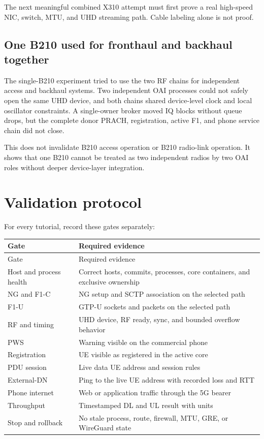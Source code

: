 \documentclass[11pt,a4paper]{article}
\begin{document}
The next meaningful combined X310 attempt must first prove a real high-speed
NIC, switch, MTU, and UHD streaming path. Cable labeling alone is not proof.

\subsection{One B210 used for fronthaul and backhaul together}

The single-B210 experiment tried to use the two RF chains for independent
access and backhaul systems. Two independent OAI processes could not safely
open the same UHD device, and both chains shared device-level clock and local
oscillator constraints. A single-owner broker moved IQ blocks without queue
drops, but the complete donor PRACH, registration, active F1, and phone service
chain did not close.

This does not invalidate B210 access operation or B210 radio-link operation.
It shows that one B210 cannot be treated as two independent radios by two OAI
roles without deeper device-layer integration.

\section{Validation protocol}
\label{sec:validation}

For every tutorial, record these gates separately:

\begin{longtable}{@{}L{42mm}L{115mm}@{}}
\toprule
Gate & Required evidence \\
\midrule
\endfirsthead
\toprule
Gate & Required evidence \\
\midrule
\endhead
Host and process health & Correct hosts, commits, processes, core containers, and exclusive ownership \\
NG and F1-C & NG setup and SCTP association on the selected path \\
F1-U & GTP-U sockets and packets on the selected path \\
RF and timing & UHD device, RF ready, sync, and bounded overflow behavior \\
PWS & Warning visible on the commercial phone \\
Registration & UE visible as registered in the active core \\
PDU session & Live data UE address and session rules \\
External-DN & Ping to the live UE address with recorded loss and RTT \\
Phone internet & Web or application traffic through the 5G bearer \\
Throughput & Timestamped DL and UL result with units \\
Stop and rollback & No stale process, route, firewall, MTU, GRE, or WireGuard state \\
\bottomrule
\end{longtable}
\end{document}
